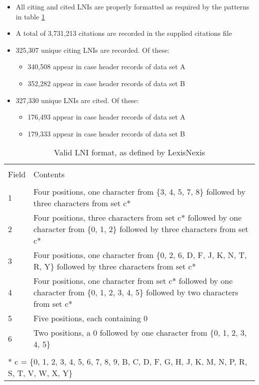 \documentclass[10pt, letterpaper]{article}
\begin{document}
\begin{spacing}{1.0}
\begin{itemize}\setlength\itemsep{1pt}
    \item All citing and cited LNIs are properly formatted as required by the patterns in table \ref{tab:LNIField}
    \item A total of 3,731,213 citations are recorded in the supplied citations file
    \item 325,307 unique citing LNIs are recorded.  Of these:
    \begin{itemize}[noitemsep]
      \item 340,508 appear in case header records of data set A  
      \item 352,282 appear in case header records of data set B
    \end{itemize}  
    \item 327,330 unique LNIs are cited.  Of these:
    \begin{itemize}[noitemsep]
      \item 176,493 appear in case header records of data set A  
      \item 179,333 appear in case header records of data set B
    \end{itemize}
\end{itemize}

\begin{table}[H]
    \centering
    \caption{Valid LNI format, as defined by LexisNexis}
    \small
    \begin{tabular}{p{0.25in}p{6in}}
        \hline\\[-6pt]
        Field & Contents\\[4pt]
        \hline\\[-6pt]
        1 & Four positions, one character from \{3, 4, 5, 7, 8\} followed by three characters from set c*\\
        2 & Four positions, three characters from set c* followed by one character from \{0, 1, 2\} followed by three characters from set c*\\
        3 & Four positions, one character from \{0, 2, 6, D, F, J, K, N, T, R, Y\} followed by three characters from set c*\\
        4 & Four positions, one character from set c* followed by one character from \{0, 1, 2, 3, 4, 5\} followed by two characters from set c*\\
        5 & Five positions, each containing 0\\
        6 & Two positions, a 0 followed by one character from \{0, 1, 2, 3, 4, 5\}\\[4pt]
        \hline\\[-6pt]
        \multicolumn{2}{l}{* c = \{0, 1, 2, 3, 4, 5, 6, 7, 8, 9, B, C, D, F, G, H, J, K, M, N, P, R, S, T, V, W, X, Y\}}\\
    \end{tabular}
    \label{tab:LNIField}
\end{table}


\end{spacing}
\end{document}
